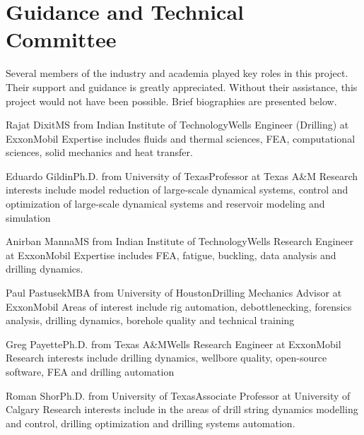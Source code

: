 \section{Guidance and Technical Committee}
Several members of the industry and academia played key roles in this project.  Their support and guidance is greatly appreciated.  Without their assistance, this project would not have been possible.  Brief biographies are presented below.

\begin{committeemember}{Rajat Dixit}{MS from Indian Institute of Technology}{Wells Engineer (Drilling) at ExxonMobil}
Expertise includes fluids and thermal sciences, FEA, computational sciences, solid mechanics and heat transfer.
\end{committeemember}

\begin{committeemember}{Eduardo Gildin}{Ph.D. from University of Texas}{Professor at Texas A\&M}
Research interests include model reduction of large-scale dynamical systems, control and optimization of large-scale dynamical systems and reservoir modeling and simulation
\end{committeemember}

\begin{committeemember}{Anirban Manna}{MS from Indian Institute of Technology}{Wells Research Engineer at ExxonMobil}
Expertise includes FEA, fatigue, buckling, data analysis and drilling dynamics.
\end{committeemember}

\begin{committeemember}{Paul Pastusek}{MBA from University of Houston}{Drilling Mechanics Advisor at ExxonMobil}
Areas of interest include rig automation, debottlenecking, forensics analysis, drilling dynamics, borehole quality and technical training
\end{committeemember}

\begin{committeemember}{Greg Payette}{Ph.D. from Texas A\&M}{Wells Research Engineer at ExxonMobil}
Research interests include drilling dynamics, wellbore quality, open-source software, FEA and drilling automation
\end{committeemember}

\begin{committeemember}{Roman Shor}{Ph.D. from University of Texas}{Associate Professor at University of Calgary}
Research interests include in the areas of drill string dynamics modelling and control, drilling optimization and drilling systems automation.
\end{committeemember}

